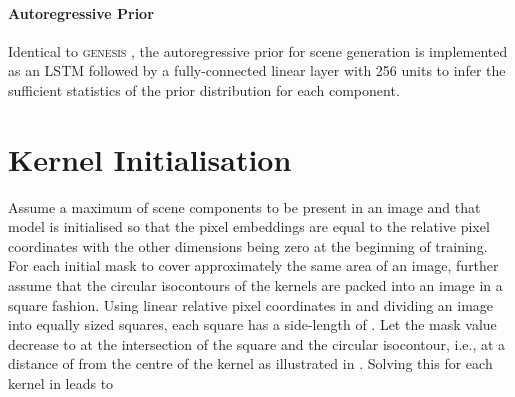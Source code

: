 \documentclass{article}
\begin{document}
\paragraph{Autoregressive Prior}
Identical to \textsc{genesis} \cite{engelcke2020genesis}, the autoregressive prior for scene generation is implemented as an LSTM \citep{hochreiter1997long} followed by a fully-connected linear layer with 256 units to infer the sufficient statistics of the prior distribution for each component.

\section{Kernel Initialisation}
\label{app:kernel_initialisation}

Assume a maximum of  scene components to be present in an image and that model is initialised so that the pixel embeddings are equal to the relative pixel coordinates with the other dimensions being zero at the beginning of training.
For each initial mask to cover approximately the same area of an image, further assume that the circular isocontours of the kernels are packed into an image in a square fashion.
Using linear relative pixel coordinates in  and dividing an image into  equally sized squares, each square has a side-length of .
Let the mask value decrease to  at the intersection of the square and the circular isocontour, i.e., at a distance of  from the centre of the kernel as illustrated in .
Solving this for each kernel in  leads to
\end{document}
